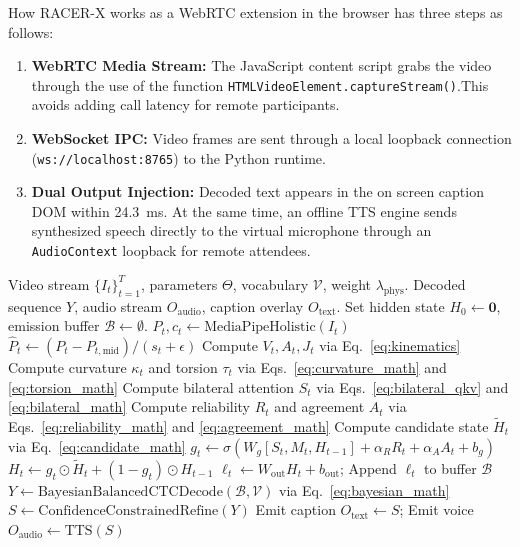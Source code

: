 \documentclass[conference]{IEEEtran}
\begin{document}
How RACER-X works as a WebRTC extension in the browser has three steps as follows:

\begin{enumerate}
    \item \textbf{WebRTC Media Stream:} The JavaScript content script grabs the video through the use of the function \texttt{HTMLVideoElement.captureStream()}.This avoids adding call latency for remote participants.

    \item \textbf{WebSocket IPC:} Video frames are sent through a local loopback connection (\texttt{ws://localhost:8765}) to the Python runtime.

    \item \textbf{Dual Output Injection:} Decoded text appears in the on screen caption DOM within 24.3~ms. At the same time, an offline TTS engine sends synthesized speech directly to the virtual microphone through an \texttt{AudioContext} loopback for remote attendees.
\end{enumerate}


\begin{algorithm}[!t]
\caption{RACER-X Live Recurrent Inference and Decoding}
\label{alg:racerx_inference}
\begin{algorithmic}[1]
\Require Video stream $\{I_t\}_{t=1}^T$, parameters $\Theta$, vocabulary $\mathcal{V}$, weight $\lambda_{\text{phys}}$.
\Ensure Decoded sequence $Y$, audio stream $O_{\text{audio}}$, caption overlay $O_{\text{text}}$.
\State Set hidden state $H_0 \leftarrow \mathbf{0}$, emission buffer $\mathcal{B} \leftarrow \emptyset$.
    \State $P_t, c_t \leftarrow \text{MediaPipeHolistic}(I_t)$
    \State $\hat{P}_t \leftarrow (P_t - P_{t,\text{mid}}) / (s_t + \epsilon)$ 
    \State Compute $V_t, A_t, J_t$ via Eq.~\eqref{eq:kinematics}
    \State Compute curvature $\kappa_t$ and torsion $\tau_t$ via Eqs.~\eqref{eq:curvature_math} and \eqref{eq:torsion_math}
    \State Compute bilateral attention $S_t$ via Eqs.~\eqref{eq:bilateral_qkv} and \eqref{eq:bilateral_math}
    \State Compute reliability $R_t$ and agreement $A_t$ via Eqs.~\eqref{eq:reliability_math} and \eqref{eq:agreement_math}
    \State Compute candidate state $\tilde{H}_t$ via Eq.~\eqref{eq:candidate_math}
    \State $g_t \leftarrow \sigma(W_g [S_t, M_t, H_{t-1}] + \alpha_R R_t + \alpha_A A_t + b_g)$
    \State $H_t \leftarrow g_t \odot \tilde{H}_t + (1 - g_t) \odot H_{t-1}$
    \State $\ell_t \leftarrow W_{\text{out}} H_t + b_{\text{out}}$; Append $\ell_t$ to buffer $\mathcal{B}$
\EndFor
\State $Y \leftarrow \text{BayesianBalancedCTCDecode}(\mathcal{B}, \mathcal{V})$ via Eq.~\eqref{eq:bayesian_math}
\State $S \leftarrow \text{ConfidenceConstrainedRefine}(Y)$
\State Emit caption $O_{\text{text}} \leftarrow S$; Emit voice $O_{\text{audio}} \leftarrow \text{TTS}(S)$
\end{algorithmic}
\end{algorithm}
\end{document}
